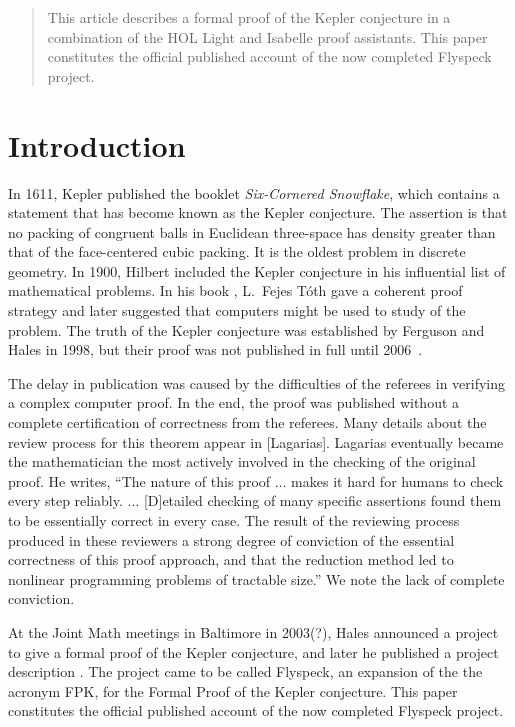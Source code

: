 \begin{abstract}
This article describes a formal proof of the Kepler conjecture in a combination of the HOL Light and Isabelle proof
assistants.
This paper constitutes the official published account of the now completed Flyspeck project.
\end{abstract}


\section{Introduction}


In 1611, Kepler published the booklet {\it Six-Cornered Snowflake},
which contains a statement that has become known as the Kepler
conjecture.  The assertion is that no packing of congruent balls in
Euclidean three-space has density greater than that of the
face-centered cubic packing.  It is the oldest problem in discrete
geometry.  In 1900, Hilbert included the Kepler conjecture in his
influential list of mathematical problems.  In his book \cite{XX}, L.\
Fejes T\'oth gave a coherent proof strategy and later suggested that
computers might be used to study of the problem.  The truth of the
Kepler conjecture was established by Ferguson and Hales in 1998, but
their proof was not published in full until 2006~\cite{DCG}.

The delay in publication was caused by the difficulties of the
referees in verifying a complex computer proof.  In the end, the proof
was published without a complete certification of correctness from the
referees.  Many details about the review process for this theorem
appear in [Lagarias].  Lagarias eventually became the mathematician
the most actively involved in the checking of the original proof.  He
writes, ``The nature of this proof $\ldots$ makes it hard for humans
to check every step reliably. $\ldots$ [D]etailed checking of many
specific assertions found them to be essentially correct in every
case.  The result of the reviewing process produced in these reviewers
a strong degree of conviction of the essential correctness of this
proof approach, and that the reduction method led to nonlinear
programming problems of tractable size.''  We note the lack of
complete conviction.

At the Joint Math meetings in Baltimore in 2003(?), Hales announced a
project to give a formal proof of the Kepler conjecture, and later he
published a project description \cite{MAPS XX}.
The project came to be called Flyspeck, an expansion of the the
acronym FPK, for the Formal Proof of the Kepler conjecture.  This
paper constitutes the official published account of the now completed
Flyspeck project.


